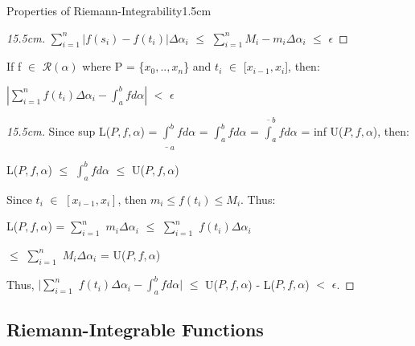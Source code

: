 \begin{ltheorem}{Properties of Riemann-Integrability}{1.5cm}
\begin{proof}[15.5cm]
                \hspace{0.5cm}
                $\sum_{i=1}^n |f(s_i) - f(t_i)| \Delta \alpha_i$
                $\leq$ $\sum_{i=1}^n M_i - m_i \Delta \alpha_i$
                $\leq$ $\epsilon$    
            \end{proof}

        \item If f $\in$ $\mathscr{R}(\alpha)$ where
            P = \{$x_0,..,x_n$\} and $t_i$ $\in$ [$x_{i-1},x_i$],
            then:
        
            \hspace{1cm}
            $| \sum_{i=1}^n f(t_i) \Delta \alpha_i - \int_a^b f d \alpha |$
            $<$ $\epsilon$

            \begin{proof}[15.5cm]
                Since
                sup L($P,f,\alpha$) = $\underline{\int}_a^b f d \alpha$
                = $\int_a^b f d \alpha$
                = $\overline{\int}_a^b f d \alpha$ = inf U($P,f,\alpha$), then:

                \hspace{0.5cm}
                L($P,f,\alpha$) $\leq$ $\int_a^b f d \alpha$ $\leq$ U($P,f,\alpha$)

                Since $t_i$ $\in$ $[x_{i-1},x_i]$, then $m_i \leq f(t_i) \leq M_i$.
                Thus:
                
                \hspace{0.5cm}
                L($P,f,\alpha$) = $\sum_{i=1}^n$ $m_i \Delta \alpha_i$
                $\leq$ $\sum_{i=1}^n$ $f(t_i) \Delta \alpha_i$

                \hspace{5.2cm}
                $\leq$ $\sum_{i=1}^n$ $M_i \Delta \alpha_i$ = U($P,f,\alpha$)

                Thus, $| \sum_{i=1}^n$ $f(t_i) \Delta \alpha_i
                - \int_a^b f d \alpha |$
                $\leq$ U($P,f,\alpha$) - L($P,f,\alpha$)
                $<$ $\epsilon$.
            \end{proof}
    \end{ltheorem}

    \newpage





\subsection{ Riemann-Integrable Functions }

